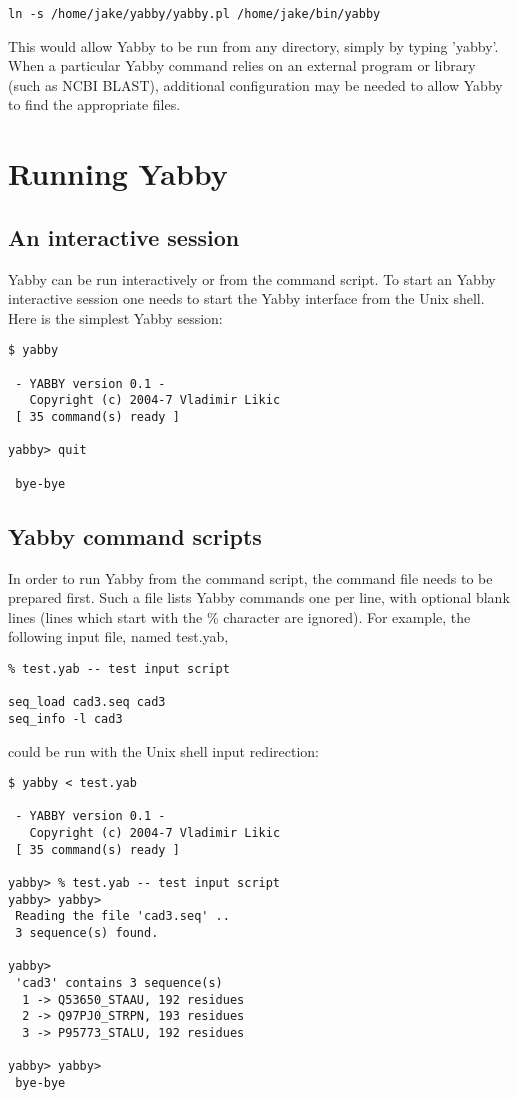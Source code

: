 \begin{verbatim}
ln -s /home/jake/yabby/yabby.pl /home/jake/bin/yabby
\end{verbatim}

This would allow Yabby to be run from any directory, simply by
typing 'yabby'. When a particular Yabby command relies on an 
external program or library (such as NCBI BLAST), additional
configuration may be needed to allow Yabby to find the appropriate
files.

\section{Running Yabby}

\subsection{An interactive session}

Yabby can be run interactively or from the command script. To
start an Yabby interactive session one needs to start the Yabby
interface from the Unix shell. Here is the simplest Yabby session:

\begin{verbatim}
$ yabby

 - YABBY version 0.1 - 
   Copyright (c) 2004-7 Vladimir Likic
 [ 35 command(s) ready ]

yabby> quit

 bye-bye
\end{verbatim}

\subsection{Yabby command scripts}

In order to run Yabby from the command script, the command file
needs to be prepared first. Such a file lists Yabby commands
one per line, with optional blank lines (lines which start with
the \% character are ignored). For example, the following input
file, named test.yab,

\begin{verbatim}
% test.yab -- test input script

seq_load cad3.seq cad3
seq_info -l cad3
\end{verbatim}

could be run with the Unix shell input redirection:

\begin{verbatim}
$ yabby < test.yab

 - YABBY version 0.1 - 
   Copyright (c) 2004-7 Vladimir Likic
 [ 35 command(s) ready ]

yabby> % test.yab -- test input script
yabby> yabby> 
 Reading the file 'cad3.seq' ..
 3 sequence(s) found.

yabby> 
 'cad3' contains 3 sequence(s)
  1 -> Q53650_STAAU, 192 residues
  2 -> Q97PJ0_STRPN, 193 residues
  3 -> P95773_STALU, 192 residues

yabby> yabby> 
 bye-bye
\end{verbatim}

